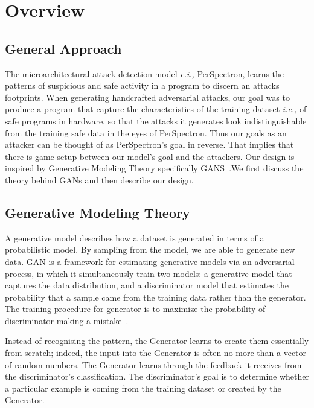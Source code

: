 \section{ Overview}\label{overview}
\subsection{General Approach}

 The microarchitectural attack detection model {\em e.i.,} PerSpectron, learns the patterns of suspicious and safe activity in a program to discern an attacks footprints.
When generating handcrafted adversarial attacks, our goal was to produce a program that capture the characteristics of the training dataset {\em i.e., } of safe programs in hardware, so that the attacks it generates look indistinguishable from the training safe data in the eyes of PerSpectron. Thus our goals as an attacker can be thought of as PerSpectron's goal in reverse. That implies that there is game setup between our model's goal and the attackers. Our design is inspired by Generative Modeling Theory specifically GANS~\cite{goodfellow2014generative}.We first discuss the theory behind GANs and then describe our design.  


\subsection{Generative Modeling Theory}
A generative model describes how a dataset is generated in
terms of a probabilistic model. By sampling from the model,
we are able to generate new data. GAN is a framework for
estimating generative models via an adversarial process, in
which it simultaneously train two models: a generative model
that captures the data distribution, and a discriminator model
that estimates the probability that a sample came from the
training data rather than the generator. The training procedure
for generator is to maximize the probability of discriminator
making a mistake~\cite{goodfellow2014generative}.


Instead of recognising the pattern, the Generator learns to create them essentially from scratch; indeed, the input into the Generator is often no more than a vector of random numbers.  The Generator learns through the feedback it receives from the discriminator's classification. The discriminator's goal is to determine whether a particular example is coming from the training dataset or created by the Generator.
 
